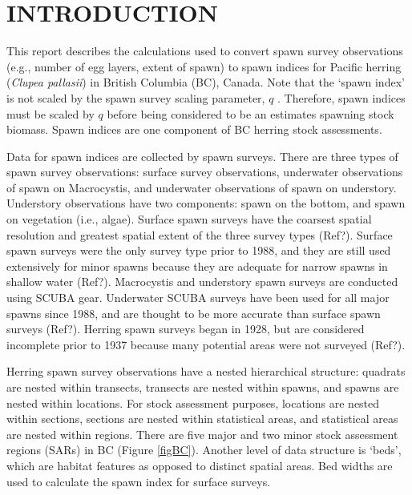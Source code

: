\documentclass[12pt]{article}
\begin{document}

\tableofcontents \clearpage  %

\thispagestyle{empty}  %


\section{INTRODUCTION}

This report describes the calculations used to convert spawn survey observations (e.g., number of egg layers, extent of spawn) to spawn indices for Pacific herring (\!\emph{Clupea pallasii}) in British Columbia (BC), Canada.
Note that the `spawn index' is not scaled by the spawn survey scaling parameter, $q$ \citeyearpar[CSAS][]{CSAS2015b}.
Therefore, spawn indices must be scaled by $q$ before being considered to be an estimates spawning stock biomass.
Spawn indices are one component of BC herring stock assessments.

Data for spawn indices are collected by spawn surveys.
There are three types of spawn survey observations: surface survey observations, underwater observations of spawn on Macrocystis, and underwater observations of spawn on understory.
Understory observations have two components: spawn on the bottom, and spawn on vegetation (i.e., algae).
Surface spawn surveys have the coarsest spatial resolution and greatest spatial extent of the three survey types (Ref?).
Surface spawn surveys were the only survey type prior to 1988, and they are still used extensively for minor spawns because they are adequate for narrow spawns in shallow water (Ref?).
Macrocystis and understory spawn surveys are conducted using SCUBA gear.
Underwater SCUBA surveys have been used for all major spawns since 1988, and are thought to be more accurate than surface spawn surveys (Ref?).
Herring spawn surveys began in 1928, but are considered incomplete prior to 1937 because many potential areas were not surveyed (Ref?).

Herring spawn survey observations have a nested hierarchical structure: quadrats are nested within transects, transects are nested within spawns, and spawns are nested within locations.
For stock assessment purposes, locations are nested within sections, sections are nested within statistical areas, and statistical areas are nested within regions.
There are five major and two minor stock assessment regions (SARs) in BC (Figure \ref{figBC}).
Another level of data structure is `beds', which are habitat features as opposed to distinct spatial areas.
Bed widths are used to calculate the spawn index for surface surveys.
\end{document}
